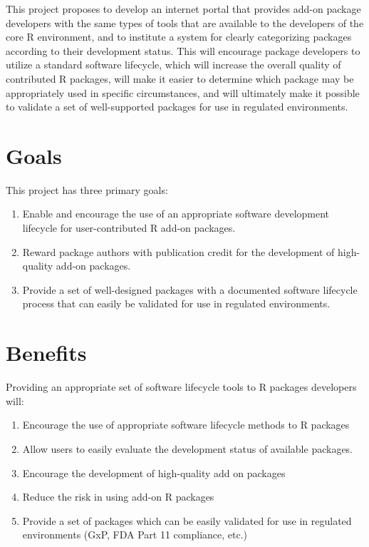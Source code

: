 \documentclass[12pt]{article}
\begin{document}
This project proposes to develop an internet portal that provides
add-on package developers with the same types of tools that are
available to the developers of the core R environment, and to
institute a system for clearly categorizing packages according to
their development status.  This will encourage package developers to
utilize a standard software lifecycle, which will increase the overall
quality of contributed R packages, will make it easier to determine
which package may be appropriately used in specific circumstances, and
will ultimately make it possible to validate a set of well-supported
packages for use in regulated environments.


\section{Goals}

This project has three primary goals:

\begin{enumerate}
\item Enable and encourage the use of an appropriate software
  development lifecycle for user-contributed R add-on packages.

\item Reward package authors with publication credit for the
  development of high-quality add-on packages.

\item Provide a set of well-designed packages with a documented
  software lifecycle process that can easily be validated for use in
  regulated environments.

\end{enumerate}

\section{Benefits}

Providing an appropriate set of software lifecycle tools to R packages
developers will:
\begin{enumerate}

\item Encourage the use of appropriate software lifecycle methods to R
  packages
\item Allow users to easily evaluate the development status of
  available packages.
\item Encourage the development of high-quality add on packages
\item Reduce the risk in using add-on R packages
\item Provide a set of packages which can be easily validated for use
  in regulated environments (GxP, FDA Part 11 compliance, etc.)
\end{enumerate}
\end{document}
